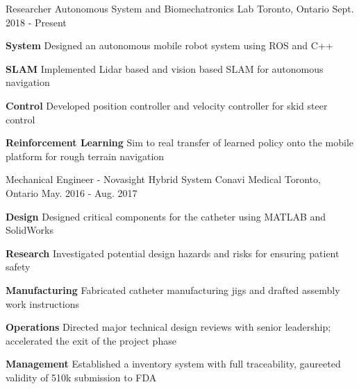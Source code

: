\begin{cventries}
	\cventry
	{Researcher}
	{Autonomous System and Biomechatronics Lab}
	{Toronto, Ontario}
	{Sept. 2018 - Present}
	{
		\begin{cvitems}
			\item {
				\textbf{System} Designed an autonomous mobile robot system using ROS and C++
			}
			\item {
				\textbf{SLAM} Implemented Lidar based and vision based SLAM for autonomous navigation
			}
			\item {
				\textbf{Control} Developed position controller and velocity controller for skid steer control
			}
			\item {
				\textbf{Reinforcement Learning} Sim to real transfer of learned policy onto the mobile platform for rough terrain navigation
			}
		\end{cvitems}
	}
	\cventry
	{Mechanical Engineer - Novasight Hybrid System}
	{Conavi Medical} 
	{Toronto, Ontario}
	{May. 2016 - Aug. 2017}
	{
		\begin{cvitems}
			\item {
				\textbf{Design} Designed critical components for the catheter using MATLAB and SolidWorks
			}
			\item {
				\textbf{Research} Investigated potential design hazards and risks for ensuring patient safety
			}
			\item {
				\textbf{Manufacturing} Fabricated catheter manufacturing jigs and drafted assembly work instructions
			}
			\item {
				\textbf{Operations} Directed major technical design reviews with senior leadership; accelerated the exit of the project phase
			}
			\item {
				\textbf{Management} Established a inventory system with full traceability, gaureeted validity of 510k submission to FDA
			}
		\end{cvitems}
	}  
\end{cventries}
